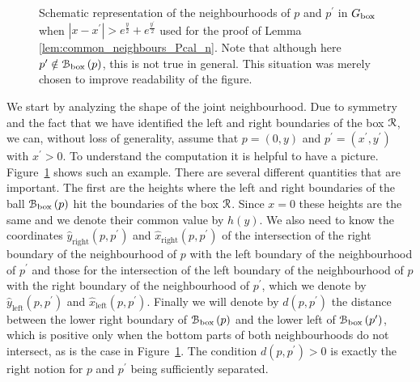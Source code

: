 \begin{figure}[!t]
\caption{Schematic representation of the neighbourhoods of $p$ and $p^\prime$ in $G_{\mathrm{box}}$ when $|x - x^\prime| > e^{\frac{y}{2}} + e^{\frac{y^\prime}{2}}$ used for the proof of Lemma \ref{lem:common_neighbours_Pcal_n}. Note that although here $p^\prime \notin {\mathcal B}_{\text{box}}\left(p\right)$, this is not true in general. This situation was merely chosen to improve readability of the figure.}
\label{fig:representation_disjoint_neighbourhoods_P_n_3}
\end{figure}


We start by analyzing the shape of the joint neighbourhood. Due to symmetry and the fact that we have identified the left and right boundaries of the box ${\mathcal R}$, we can, without loss of generality, assume that $p = (0,y)$ and $p^\prime = (x^\prime,y^\prime)$ with $x^\prime > 0$. To understand the computation it is helpful to have a picture. Figure~\ref{fig:representation_disjoint_neighbourhoods_P_n_3} shows such an example. There are several different quantities that are important. The first are the heights where the left and right boundaries of the ball ${\mathcal B}_{\text{box}}\left(p\right)$ hit the boundaries of the box ${\mathcal R}$. Since $x = 0$ these heights are the same and we denote their common value by $h(y)$. We also need to know the coordinates $\hat{y}_{\text{right}}(p,p^\prime)$ and $\hat{x}_{\text{right}}(p,p^\prime)$ of the intersection of the right boundary of the neighbourhood of $p$ with the left boundary of the neighbourhood of $p^\prime$ and those for the intersection of the left boundary of the neighbourhood of $p$ with the right boundary of the neighbourhood of $p^\prime$, which we denote by $\hat{y}_{\text{left}}(p,p^\prime)$ and $\hat{x}_{\text{left}}(p,p^\prime)$. Finally we will denote by $d(p,p^\prime)$ the distance between the lower right boundary of ${\mathcal B}_{\text{box}}\left(p\right)$ and the lower left of ${\mathcal B}_{\text{box}}\left(p^\prime\right)$, which is positive only when the bottom parts of both neighbourhoods do not intersect, as is the case in Figure~\ref{fig:representation_disjoint_neighbourhoods_P_n_3}. The condition $d(p,p^\prime) > 0$ is exactly the right notion for $p$ and $p^\prime$ being sufficiently separated.

